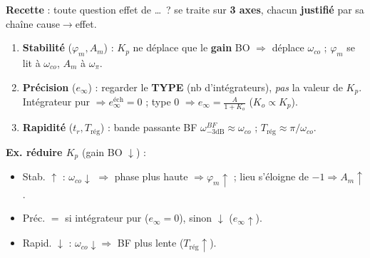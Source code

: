 \begin{tcolorbox}[colback=ch6teal!5,colframe=ch6teal!80!black,title={Questions qualitatives : effet d'un r\'eglage sur la BF}]
\textbf{Recette} : toute question \og effet de \dots\ ? \fg{} se traite sur \textbf{3 axes}, chacun \textbf{justifi\'e} par sa cha\^ine cause$\to$effet.
\begin{enumerate}\setlength\itemsep{0pt}
  \item \textbf{Stabilit\'e} ($\varphi_m, A_m$) : $K_p$ ne d\'eplace que le \textbf{gain} BO $\Rightarrow$ d\'eplace $\omega_{co}$ ; $\varphi_m$ se lit \`a $\omega_{co}$, $A_m$ \`a $\omega_\pi$.
  \item \textbf{Pr\'ecision} ($e_\infty$) : regarder le \textbf{TYPE} (nb d'int\'egrateurs), \emph{pas} la valeur de $K_p$. Int\'egrateur pur $\Rightarrow e_\infty^{\text{\'ech}}{=}0$ ; type 0 $\Rightarrow e_\infty{=}\frac{A}{1+K_o}$ ($K_o{\propto}K_p$).
  \item \textbf{Rapidit\'e} ($t_r, T_{\text{r\'eg}}$) : bande passante BF $\omega_{-3\text{dB}}^{BF}\approx\omega_{co}$ ; $T_{\text{r\'eg}}\approx\pi/\omega_{co}$.
\end{enumerate}
\textbf{Ex. r\'eduire $K_p$} (gain BO $\downarrow$) :
\begin{itemize}\setlength\itemsep{0pt}
  \item Stab. \textbf{$\uparrow$} : $\omega_{co}\downarrow$ $\Rightarrow$ phase plus haute $\Rightarrow \varphi_m\uparrow$ ; lieu s'\'eloigne de $-1 \Rightarrow A_m\uparrow$.
  \item Pr\'ec. \textbf{$=$} si int\'egrateur pur ($e_\infty{=}0$), sinon \textbf{$\downarrow$} ($e_\infty\uparrow$).
  \item Rapid. \textbf{$\downarrow$} : $\omega_{co}\downarrow \Rightarrow$ BF plus lente ($T_{\text{r\'eg}}\uparrow$).
\end{itemize}
\end{tcolorbox}

